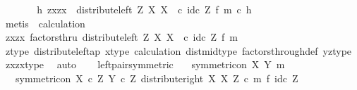 \begin{isabellebody}
\ \ \ \ \isamarkupfalse%
\ \isamarkupfalse%
\ {\isachardoublequoteopen}{\isasymexists}h{\isachardot}{\kern0pt}\ {\isasymlangle}{\isasymlangle}z{\isacharcomma}{\kern0pt}x{\isasymrangle}{\isacharcomma}{\kern0pt}{\isasymlangle}z{\isacharcomma}{\kern0pt}x{\isasymrangle}{\isasymrangle}\ {\isacharequal}{\kern0pt}\ {\isacharparenleft}{\kern0pt}distribute{\isacharunderscore}{\kern0pt}left\ Z\ X\ X\ \ {\isasymcirc}\isactrlsub c\ {\isacharparenleft}{\kern0pt}id\isactrlsub c\ Z\ {\isasymtimes}\isactrlsub f\ m{\isacharparenright}{\kern0pt}{\isacharparenright}{\kern0pt}\ {\isasymcirc}\isactrlsub c\ h{\isachardoublequoteclose}\isanewline
\ \ \ \ \ \ \isamarkupfalse%
\ {\isacharparenleft}{\kern0pt}metis\ \ calculation{\isacharparenright}{\kern0pt}\isanewline
\ \ \ \ \isamarkupfalse%
\ \isamarkupfalse%
\ {\isachardoublequoteopen}{\isasymlangle}{\isasymlangle}z{\isacharcomma}{\kern0pt}x{\isasymrangle}{\isacharcomma}{\kern0pt}{\isasymlangle}z{\isacharcomma}{\kern0pt}x{\isasymrangle}{\isasymrangle}\ factorsthru\ {\isacharparenleft}{\kern0pt}distribute{\isacharunderscore}{\kern0pt}left\ Z\ X\ X\ \ {\isasymcirc}\isactrlsub c\ {\isacharparenleft}{\kern0pt}id\isactrlsub c\ Z\ {\isasymtimes}\isactrlsub f\ m{\isacharparenright}{\kern0pt}{\isacharparenright}{\kern0pt}{\isachardoublequoteclose}\isanewline
\ \ \ \ \ \ \isamarkupfalse%
\ z{\isacharunderscore}{\kern0pt}type\ distribute{\isacharunderscore}{\kern0pt}left{\isacharunderscore}{\kern0pt}ap\ x{\isacharunderscore}{\kern0pt}type\ calculation\ dist{\isacharunderscore}{\kern0pt}mid{\isacharunderscore}{\kern0pt}type\ factors{\isacharunderscore}{\kern0pt}through{\isacharunderscore}{\kern0pt}def{}\ yz{\isacharunderscore}{\kern0pt}type\ zxzx{\isacharunderscore}{\kern0pt}type\ \isamarkupfalse%
\ auto\isanewline
\ \ \isamarkupfalse%
\isanewline
{}\isamarkupfalse%
%
\endisatagproof
{\isafoldproof}%
%
\isadelimproof
\isanewline
%
\endisadelimproof
\isanewline
{}\isamarkupfalse%
\ left{\isacharunderscore}{\kern0pt}pair{\isacharunderscore}{\kern0pt}symmetric{\isacharcolon}{\kern0pt}\isanewline
\ \ \ {\isachardoublequoteopen}symmetric{\isacharunderscore}{\kern0pt}on\ X\ {\isacharparenleft}{\kern0pt}Y{\isacharcomma}{\kern0pt}\ m{\isacharparenright}{\kern0pt}{\isachardoublequoteclose}\isanewline
\ \ \ {\isachardoublequoteopen}symmetric{\isacharunderscore}{\kern0pt}on\ {\isacharparenleft}{\kern0pt}X\ {\isasymtimes}\isactrlsub c\ Z{\isacharparenright}{\kern0pt}\ {\isacharparenleft}{\kern0pt}Y\ {\isasymtimes}\isactrlsub c\ Z{\isacharcomma}{\kern0pt}\ distribute{\isacharunderscore}{\kern0pt}right\ X\ X\ Z\ {\isasymcirc}\isactrlsub c\ {\isacharparenleft}{\kern0pt}m\ {\isasymtimes}\isactrlsub f\ id\isactrlsub c\ Z{\isacharparenright}{\kern0pt}{\isacharparenright}{\kern0pt}{\isachardoublequoteclose}\isanewline

\end{isabellebody}
